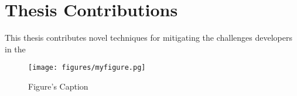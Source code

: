 \section{Thesis Contributions}
\label{sec:intro:contribution}
This thesis contributes novel techniques for mitigating the challenges  developers in the 


\begin{figure}[htbp]
    \centering
    \texttt{[image: figures/myfigure.pg]}
    \caption{Figure's Caption}
    \label{fig:myfigure}
\end{figure}
